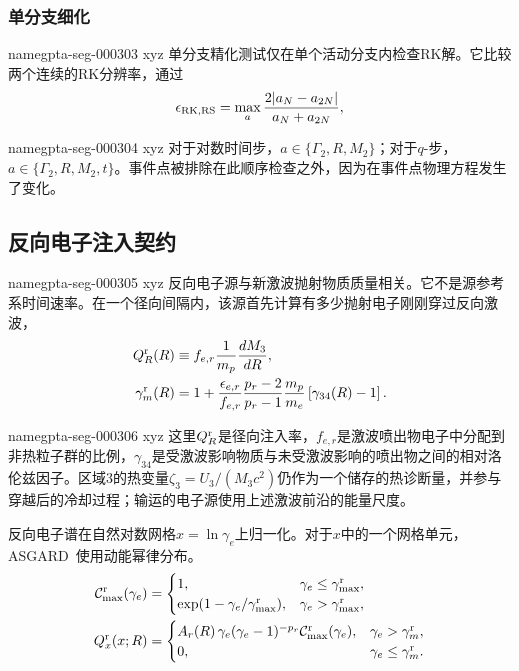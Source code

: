 \documentclass[twocolumn]{aastex702}
\makeatletter
\newcommand{\asgard}{\textsc{ASGARD}}
\providecommand{\gptareaderanchor}[1]{\pdfdest name{#1} xyz}%
\providecommand{\gptareaderanchor}[1]{\special{pdf:dest (#1) [ @thispage /XYZ @xpos @ypos null ]}}%
\makeatother
\begin{document}
\subsubsection{单分支细化}


\gptareaderanchor{gpta-seg-000303}%
单分支精化测试仅在单个活动分支内检查RK解。它比较两个连续的RK分辨率，通过
\begin{equation}
\epsilon_{\rm RK,RS}=\max_a\frac{2|a_N-a_{2N}|}{a_N+a_{2N}},
\end{equation}

\gptareaderanchor{gpta-seg-000304}%
对于对数时间步，\(a\in\{\Gamma_2,R,M_2\}\)；对于\(q\)-步，\(a\in\{\Gamma_2,R,M_2,t\}\)。事件点被排除在此顺序检查之外，因为在事件点物理方程发生了变化。

\subsection{反向电子注入契约}


\gptareaderanchor{gpta-seg-000305}%
反向电子源与新激波抛射物质质量相关。它不是源参考系时间速率。在一个径向间隔内，该源首先计算有多少抛射电子刚刚穿过反向激波，
\begin{equation}
\begin{aligned}
Q_R^{\rm r}(R)&\equiv
f_{e,r}\frac{1}{m_p}\frac{dM_3}{dR},\\
\gamma_m^{\rm r}(R)&=1+
\frac{\epsilon_{e,r}}{f_{e,r}}
\frac{p_r-2}{p_r-1}
\frac{m_p}{m_e}\left[\gamma_{34}(R)-1\right].
\end{aligned}
\end{equation}

\gptareaderanchor{gpta-seg-000306}%
这里\(Q_R^{\rm r}\)是径向注入率，\(f_{e,r}\)是激波喷出物电子中分配到非热粒子群的比例，\(\gamma_{34}\)是受激波影响物质与未受激波影响的喷出物之间的相对洛伦兹因子。区域3的热变量\(\zeta_3=U_3/(M_3c^2)\)仍作为一个储存的热诊断量，并参与穿越后的冷却过程；输运的电子源使用上述激波前沿的能量尺度。

反向电子谱在自然对数网格\(x=\ln\gamma_e\)上归一化。对于\(x\)中的一个网格单元，\asgard\ 使用动能幂律分布。
\begin{equation}
\begin{aligned}
\mathcal C_{\max}^{\rm r}(\gamma_e)&=
\begin{cases}
1, & \gamma_e\le\gamma_{\max}^{\rm r},\\
\exp(1-\gamma_e/\gamma_{\max}^{\rm r}),&
\gamma_e>\gamma_{\max}^{\rm r},
\end{cases}\\
Q_x^{\rm r}(x;R)&=
\begin{cases}
A_r(R)\,\gamma_e(\gamma_e-1)^{-p_r}
\mathcal C_{\max}^{\rm r}(\gamma_e),
& \gamma_e>\gamma_m^{\rm r},\\
0, & \gamma_e\le\gamma_m^{\rm r}.
\end{cases}
\end{aligned}
\end{equation}
\end{document}
